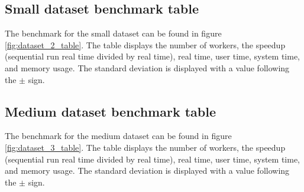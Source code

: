 \subsection{Small dataset benchmark table}
The benchmark for the small dataset can be found in figure \ref{fig:dataset_2_table}.
The table displays the number of workers, the speedup (sequential run real time divided by real time), real time,
user time, system time, and memory usage. The standard deviation is displayed with a value following the $\pm$ sign.

\begin{table}[ht]
\centering
{}
\caption[Small dataset benchmark table.]{Small dataset benchmark table. The table displays the number of workers, the speedup (sequential run real time divided by real time), real time,
user time, system time, and memory usage. The standard deviation is displayed with a value following the $\pm$ sign.}
\label{fig:dataset_2_table}
\end{table}

\subsection{Medium dataset benchmark table}
The benchmark for the medium dataset can be found in figure \ref{fig:dataset_3_table}.
The table displays the number of workers, the speedup (sequential run real time divided by real time), real time,
user time, system time, and memory usage. The standard deviation is displayed with a value following the $\pm$ sign.

\begin{table}[ht]
\centering
{}
\caption[Medium dataset benchmark table.]{Medium dataset benchmark table. The table displays the number of workers, the speedup (sequential run real time divided by real time), real time,
user time, system time, and memory usage. The standard deviation is displayed with a value following the $\pm$ sign.}
\label{fig:dataset_3_table}
\end{table}

